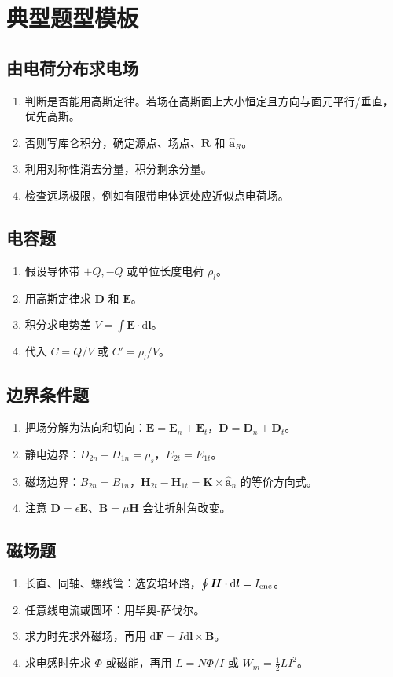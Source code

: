 \documentclass[11pt,a4paper]{ctexart}
\newcommand{\dd}{\mathrm{d}}
\newcommand{\uv}[1]{\hat{\bm a}_{#1}}
\newcommand{\E}{\bm E}
\newcommand{\D}{\bm D}
\newcommand{\B}{\bm B}
\newcommand{\Hf}{\bm H}
\newcommand{\K}{\bm K}
\begin{document}
\section{典型题型模板}
\subsection{由电荷分布求电场}
\begin{enumerate}
\item 判断是否能用高斯定律。若场在高斯面上大小恒定且方向与面元平行/垂直，优先高斯。
\item 否则写库仑积分，确定源点、场点、$\bm R$ 和 $\uv R$。
\item 利用对称性消去分量，积分剩余分量。
\item 检查远场极限，例如有限带电体远处应近似点电荷场。
\end{enumerate}

\subsection{电容题}
\begin{enumerate}
\item 假设导体带 $+Q,-Q$ 或单位长度电荷 $\rho_l$。
\item 用高斯定律求 $\D$ 和 $\E$。
\item 积分求电势差 $V=\int \E\cdot\dd\bm l$。
\item 代入 $C=Q/V$ 或 $C'=\rho_l/V$。
\end{enumerate}

\subsection{边界条件题}
\begin{enumerate}
\item 把场分解为法向和切向：$\E=\E_n+\E_t$，$\D=\D_n+\D_t$。
\item 静电边界：$D_{2n}-D_{1n}=\rho_s$，$E_{2t}=E_{1t}$。
\item 磁场边界：$B_{2n}=B_{1n}$，$\Hf_{2t}-\Hf_{1t}=\K\times\uv n$ 的等价方向式。
\item 注意 $\D=\epsilon\E$、$\B=\mu\Hf$ 会让折射角改变。
\end{enumerate}

\subsection{磁场题}
\begin{enumerate}
\item 长直、同轴、螺线管：选安培环路，$\oint\Hf\cdot\dd\bm l=I_{\rm enc}$。
\item 任意线电流或圆环：用毕奥-萨伐尔。
\item 求力时先求外磁场，再用 $\dd\bm F=I\dd\bm l\times\B$。
\item 求电感时先求 $\Phi$ 或磁能，再用 $L=N\Phi/I$ 或 $W_m=\frac12LI^2$。
\end{enumerate}
\end{document}
